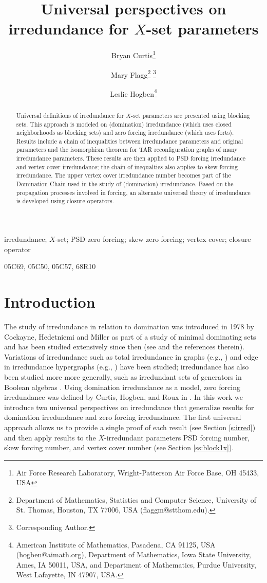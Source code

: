 \documentclass{article}
\title{Universal perspectives on irredundance for $X$-set parameters}
\author{Bryan Curtis\thanks{
Air Force Research Laboratory, Wright-Patterson Air Force Base, OH 45433, USA
}\and
Mary Flagg\thanks{Department of Mathematics, Statistics and Computer Science, University of St. Thomas, Houston, TX 77006, USA (flaggm@stthom.edu).} \thanks{Corresponding Author.}\and
   Leslie
Hogben\thanks{American Institute of Mathematics, Pasadena, CA 91125, USA
(hogben@aimath.org), Department of Mathematics, Iowa State University,
Ames, IA 50011, USA, and Department of Mathematics, Purdue University, West Lafayette, IN 47907, USA.}}
\numberwithin{figure}{section}
\numberwithin{table}{section}
\numberwithin{equation}{section}
\theoremstyle{definition}
\theoremstyle{definition}
\theoremstyle{definition}
\newcommand{\noi}{\noindent}
\begin{document}

\maketitle 

\begin{abstract}  Universal definitions of irredundance for $X$-set parameters are presented using blocking sets.  This approach is modeled on (domination) irredundance (which uses closed neighborhoods as blocking sets) and zero forcing irredundance (which uses forts).  {Results include a chain of inequalities between irredundance parameters and original parameters and the isomorphism theorem for TAR reconfiguration graphs of many irredundance parameters. These results are then applied to PSD forcing irredundance and vertex cover irredundance; the chain of inequalties also applies to  skew forcing irredundance. The upper vertex cover irredundance number becomes part of the Domination Chain used in the study of (domination) irredundance.}  Based on the propagation processes involved in forcing, an alternate universal theory of irredundance is developed using closure operators.
\end{abstract}

 \noi {\bf Keywords} irredundance; $X$-set;   PSD zero forcing; skew zero forcing; vertex cover; closure operator  

\noi{\bf AMS subject classification}  05C69, 05C50, 05C57, 68R10



\section{Introduction}


 
 The study of irredundance in relation to domination was introduced in 1978 by Cockayne, Hedetniemi and Miller \cite{CHM78} as part of a study of minimal dominating sets and has been studied extensively since then (see \cite{MR21} and the references therein). 
Variations of irredundance such as total irredundance in graphs (e.g., \cite{FHHHK02}) and edge in irredundance hypergraphs (e.g., \cite{CKMU19hyper}) have been studied; irredundance has also been studied more more generally, such as irredundant sets of generators  in Boolean algebras \cite{T93boolean}.
Using domination irredundance as a model,  zero forcing irredundance was defined by Curtis, Hogben, and Roux in \cite{ZIR}.  
In this work we introduce two universal perspectives on irredundance that generalize results for domination irredundance and zero forcing irredundance. The first universal approach allows us to provide a single proof of each result (see Section \ref{s:irred}) and then apply results  to the $X$-irredundant parameters  PSD forcing  number, skew forcing  number, and vertex cover number (see Section \ref{ss:block1x}).   
\end{document}
